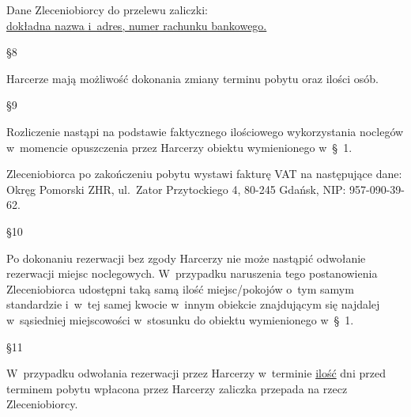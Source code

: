 Dane Zleceniobiorcy do przelewu zaliczki: \\ \uline{dokładna nazwa i~adres, numer rachunku bankowego.}

\begin{center}\S 8\end{center}
Harcerze mają możliwość dokonania zmiany terminu pobytu oraz ilości osób.

\begin{center}\S 9\end{center}
Rozliczenie nastąpi na podstawie faktycznego ilościowego wykorzystania noclegów w~momencie opuszczenia przez Harcerzy obiektu wymienionego w~\S~1.

Zleceniobiorca po zakończeniu pobytu wystawi fakturę VAT na następujące dane:\\
Okręg Pomorski ZHR, ul.~Zator Przytockiego 4, 80-245 Gdańsk, NIP: 957-090-39-62.

\begin{center}\S 10\end{center}
Po dokonaniu rezerwacji bez zgody Harcerzy nie może nastąpić odwołanie rezerwacji miejsc noclegowych. W~przypadku naruszenia tego postanowienia Zleceniobiorca udostępni taką samą ilość miejsc/pokojów o~tym samym standardzie i~w~tej samej kwocie w~innym obiekcie znajdującym się najdalej w~sąsiedniej miejscowości w~stosunku do obiektu wymienionego w~\S~1.

\begin{center}\S 11\end{center}
W~przypadku odwołania rezerwacji przez Harcerzy w~terminie \uline{ilość} dni przed terminem pobytu wpłacona przez Harcerzy zaliczka przepada na rzecz Zleceniobiorcy.
 
